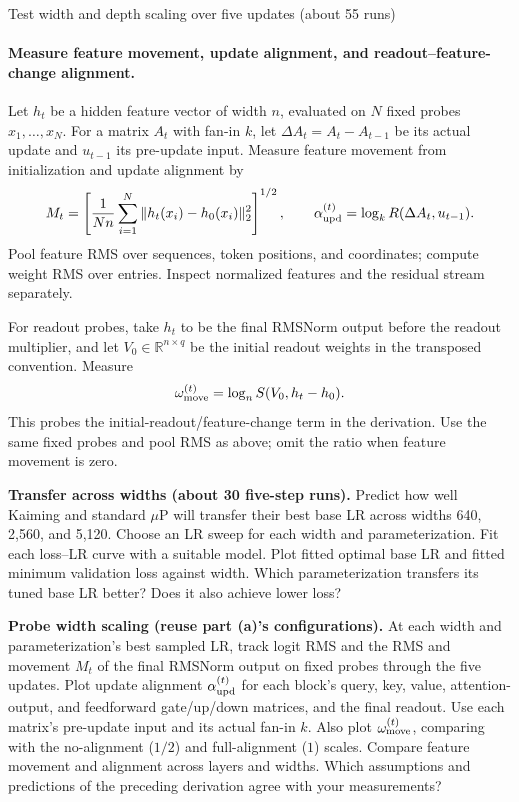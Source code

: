 \begin{problem}{Test width and depth scaling over five updates (about 55 runs)}
\paragraph{Measure feature movement, update alignment, and readout--feature-change alignment.}
Let $h_t$ be a hidden feature vector of width $n$, evaluated on $N$ fixed
probes $x_1,\ldots,x_N$. For a matrix $A_t$ with fan-in $k$, let
$\Delta A_t=A_t-A_{t-1}$ be its actual update and $u_{t-1}$ its pre-update input.
Measure feature movement from initialization and update alignment by
\[
 M_t=\left[\frac1{Nn}\sum_{i=1}^N
 \|h_t(x_i)-h_0(x_i)\|_2^2\right]^{1/2},\qquad
 \alpha_{\rm upd}^{(t)}=\log_k R(\Delta A_t,u_{t-1}).
\]
Pool feature RMS over sequences, token positions, and coordinates; compute
weight RMS over entries. Inspect normalized features and the residual stream
separately.

For readout probes, take $h_t$ to be the final RMSNorm output before the
readout multiplier, and let $V_0\in\mathbb R^{n\times q}$ be the initial
readout weights in the transposed convention. Measure
\[
 \omega_{\rm move}^{(t)}=\log_n S(V_0,h_t-h_0).
\]
This probes the initial-readout/feature-change term in the derivation.
Use the same fixed probes and pool RMS as above; omit the ratio when
feature movement is zero.

\begin{parts}
\item \textbf{Transfer across widths (about 30 five-step runs).}
Predict how well Kaiming and standard $\mu$P will transfer their best base LR
across widths 640, 2,560, and 5,120. Choose an LR sweep for each width
and parameterization.
Fit each loss--LR curve with a suitable model. Plot fitted optimal base LR
and fitted minimum validation loss against width. Which parameterization
transfers its tuned base LR better? Does it also achieve lower loss?

\item \textbf{Probe width scaling (reuse part (a)'s configurations).}
At each width and parameterization's best sampled LR, track logit RMS and
the RMS and movement $M_t$ of the final RMSNorm output on fixed probes
through the five updates. Plot update alignment $\alpha_{\rm upd}^{(t)}$ for
each block's query, key, value, attention-output, and feedforward gate/up/down
matrices, and the final readout. Use each matrix's pre-update input and its
actual fan-in $k$. Also plot $\omega_{\rm move}^{(t)}$, comparing with the no-alignment ($1/2$) and
full-alignment ($1$) scales. Compare feature movement and alignment across
layers and widths. Which assumptions and predictions of the preceding derivation agree
with your measurements?


\end{parts}
\end{problem}
